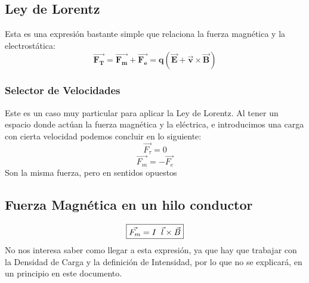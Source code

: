 \subsection{Ley de Lorentz}
\noindent Esta es una expresión bastante simple que relaciona la fuerza magnética y la electrostática:
\[
        \boxed{\bm{\vec{F_T} =\vec{F_m} + \vec{F_e} =q(\vec{E} + \vec{v}\times\vec{B})}}
\]
\subsubsection{Selector de Velocidades}
\begin{wrapfigure}{r}{4cm}
\end{wrapfigure}
\noindent Este es un caso muy particular para aplicar la Ley de Lorentz. Al tener un espacio donde actúan la fuerza magnética y la eléctrica, e introducimos una carga con cierta velocidad podemos concluir en lo siguiente:
\[
        \vec{F_{\tau}}=0
\]
\[
        \boxed{\vec{F_m} = -\vec{F_e}}
\]
Son la misma fuerza, pero en sentidos opuestos
\subsection{Fuerza Magnética en un hilo conductor}
\[
        \boxed{\vec{F_m} = I \hspace{2mm}\vec{l}\times\vec{B}}
\]
No nos interesa saber como llegar a esta expresión, ya que hay que trabajar con la Densidad de Carga y la definición de Intensidad, por lo que no se explicará, en un principio en este documento.

